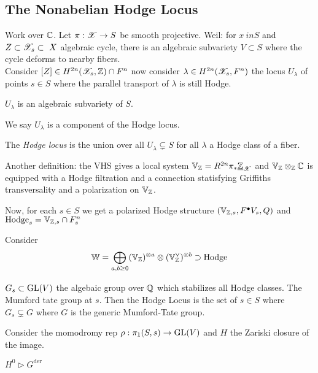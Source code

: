 \documentclass[12pt]{article}
\begin{document}
\subsection{The Nonabelian Hodge Locus}

Work over $\mathbb{C}$. Let $\pi : \mathscr{X} \to S$ be smooth projective. Weil: for $x\ in S$ and $Z \subset \mathscr{X}_s \subset\ X$ algebraic cycle, there is an algebraic subvariety $V \subset S$ where the cycle deforms to nearby fibers.
\\
Consider $[Z] \in H^{2n}(\mathscr{X}_s, \mathbb{Z}) \cap F^n$ now consider $\lambda \in H^{2n}(\mathscr{X}_s, F^n)$ the locus $U_\lambda$ of points $s \in S$ where the parallel transport of $\lambda$ is still Hodge. 

\begin{theorem}
$U_\lambda$ is an algebraic subvariety of $S$. 
\end{theorem}

We say $U_\lambda$ is a component of the Hodge locus.

\begin{defn}
The \textit{Hodge locus} is the union over all $U_\lambda \subsetneq S$ for all $\lambda$ a Hodge class of a fiber.
\end{defn}

Another definition: the VHS gives a local system $\mathbb{V}_{\mathbb{Z}} = R^{2n} \pi_* \underline{\mathbb{Z}}_{\mathscr{X}}$ and $\mathbb{V}_{\mathbb{Z}} \otimes_{\mathbb{Z}} \mathbb{C}$ is equipped with a Hodge filtration and a connection statisfying Griffiths transversality and a polarization on $\mathbb{V}_{\mathbb{Z}}$. 

Now, for each $s \in S$ we get a polarized Hodge structure $(\mathbb{V}_{\mathbb{Z},s}, F^\bullet V_s, Q)$ and $\mathrm{Hodge}_s = \mathbb{V}_{\mathbb{Z},s} \cap F_s^n$ 

Consider 
\[ \mathbb{W} = \bigoplus_{a,b \ge 0} (\mathbb{V}_{\mathbb{Z}})^{\otimes a} \otimes (\mathbb{V}_{\mathbb{Z}}^\vee)^{\otimes b} \supset \mathrm{Hodge} \]

\begin{defn}
$G_s \subset \mathrm{GL}(V)$ the algebaic group over $\mathbb{Q}$ which stabilizes all Hodge classes. The Mumford tate group at $s$. Then the Hodge Locus is the set of $s \in S$ where $G_s \subsetneq G$ where $G$ is the generic Mumford-Tate group.
\end{defn}

Consider the momodromy rep $\rho : \pi_1(S, s) \to \mathrm{GL}(V)$ and $H$ the Zariski closure of the image. 

\begin{theorem}
$H^0 \triangleright G^{\mathrm{der}}$
\end{theorem}
\end{document}
